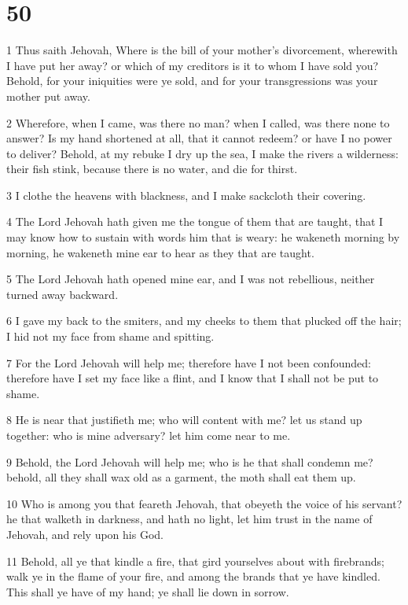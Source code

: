 \chapter{50}

\par 1 Thus saith Jehovah, Where is the bill of your mother's divorcement, wherewith I have put her away? or which of my creditors is it to whom I have sold you? Behold, for your iniquities were ye sold, and for your transgressions was your mother put away.
\par 2 Wherefore, when I came, was there no man? when I called, was there none to answer? Is my hand shortened at all, that it cannot redeem? or have I no power to deliver? Behold, at my rebuke I dry up the sea, I make the rivers a wilderness: their fish stink, because there is no water, and die for thirst.
\par 3 I clothe the heavens with blackness, and I make sackcloth their covering.
\par 4 The Lord Jehovah hath given me the tongue of them that are taught, that I may know how to sustain with words him that is weary: he wakeneth morning by morning, he wakeneth mine ear to hear as they that are taught.
\par 5 The Lord Jehovah hath opened mine ear, and I was not rebellious, neither turned away backward.
\par 6 I gave my back to the smiters, and my cheeks to them that plucked off the hair; I hid not my face from shame and spitting.
\par 7 For the Lord Jehovah will help me; therefore have I not been confounded: therefore have I set my face like a flint, and I know that I shall not be put to shame.
\par 8 He is near that justifieth me; who will content with me? let us stand up together: who is mine adversary? let him come near to me.
\par 9 Behold, the Lord Jehovah will help me; who is he that shall condemn me? behold, all they shall wax old as a garment, the moth shall eat them up.
\par 10 Who is among you that feareth Jehovah, that obeyeth the voice of his servant? he that walketh in darkness, and hath no light, let him trust in the name of Jehovah, and rely upon his God.
\par 11 Behold, all ye that kindle a fire, that gird yourselves about with firebrands; walk ye in the flame of your fire, and among the brands that ye have kindled. This shall ye have of my hand; ye shall lie down in sorrow.

